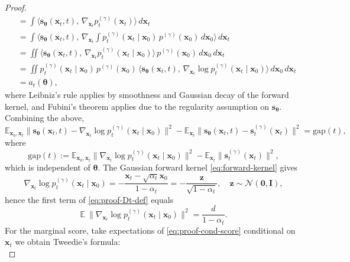 \documentclass[11pt]{article}
\newcommand{\vect}[1]{\mathbf{#1}}
\theoremstyle{plain}
\newcommand{\1}{\mathbbm{1}}
\newcommand{\btheta}{{\boldsymbol{\theta}}}
\newcommand{\vx}{\vect{x}}
\newcommand{\vs}{\vect{s}}
\newcommand{\pdist}[2][]{p_{#1}^{(#2)}}
\newcommand{\score}[2][]{\vect{s}_{#1}^{(#2)}}
\begin{document}
\begin{appendices}
\begin{proof}
\begin{align*}
   &= \int \big\langle \vs_\btheta(\vx_t,t),\, \nabla_{\vx_t}\pdist[t]{\gamma}(\vx_t)\big\rangle\, d\vx_t \\
   &= \int \Big\langle \vs_\btheta(\vx_t,t),\, \nabla_{\vx_t}\!\!\int \pdist[t]{\gamma}(\vx_t\mid\vx_0)\,\pdist{\gamma}(\vx_0)\, d\vx_0\Big\rangle\, d\vx_t \\
   &= \iint \big\langle \vs_\btheta(\vx_t,t),\, \nabla_{\vx_t}\pdist[t]{\gamma}(\vx_t\mid\vx_0)\big\rangle\,\pdist{\gamma}(\vx_0)\, d\vx_0\, d\vx_t \\
   &= \iint \pdist[t]{\gamma}(\vx_t\mid\vx_0)\,\pdist{\gamma}(\vx_0)\,\big\langle \vs_\btheta(\vx_t,t),\, \nabla_{\vx_t}\log \pdist[t]{\gamma}(\vx_t\mid\vx_0)\big\rangle\, d\vx_0\, d\vx_t \\
   &= a_t(\btheta),
\end{align*}
where Leibniz's rule applies by smoothness and Gaussian decay of the forward kernel, and Fubini's theorem applies due to the regularity assumption on $\vs_{\btheta}$. Combining the above,
\begin{equation}
   \mathbb{E}_{\vx_0,\vx_t}\!\big\|\vs_\btheta(\vx_t, t) - \nabla_{\vx_t}\log \pdist[t]{\gamma}(\vx_t\mid\vx_0)\big\|^2
   - \mathbb{E}_{\vx_t}\!\big\|\vs_\btheta(\vx_t, t) - \score[t]{\gamma}(\vx_t) \big\|^2
   = \mathrm{gap}(t),
   \label{eq:proof-residual}
\end{equation}
where
\begin{equation}
   \mathrm{gap}(t) := \mathbb{E}_{\vx_0,\vx_t}\!\big\|\nabla_{\vx_t}\log \pdist[t]{\gamma}(\vx_t\mid\vx_0)\big\|^2 - \mathbb{E}_{\vx_t}\!\big\|\score[t]{\gamma}(\vx_t)\big\|^2,
   \label{eq:proof-Dt-def}
\end{equation}
which is independent of $\btheta$. The Gaussian forward kernel \eqref{eq:forward-kernel} gives
\begin{equation}
   \nabla_{\vx_t}\log \pdist[t]{\gamma}(\vx_t\mid\vx_0)
   = -\frac{\vx_t - \sqrt{\alpha_t}\vx_0}{1-\alpha_t}
   = -\frac{\vect{z}}{\sqrt{1-\alpha_t}},\quad \vect{z}\sim\mathcal{N}(\vect{0},\vect{I}),
   \label{eq:proof-cond-score}
\end{equation}
hence the first term of \eqref{eq:proof-Dt-def} equals
\begin{equation}
\mathbb{E}~\!\big\|\nabla_{\vx_t}\log \pdist[t]{\gamma}(\vx_t\mid\vx_0)\big\|^2 = \frac{d}{1-\alpha_t}.
   \label{eq:proof-cond-norm}
\end{equation}
For the marginal score, take expectations of \eqref{eq:proof-cond-score} conditional on $\vx_t$ we obtain Tweedie's formula:
\begin{equation}

\end{equation}
\end{proof}
\end{appendices}
\end{document}
